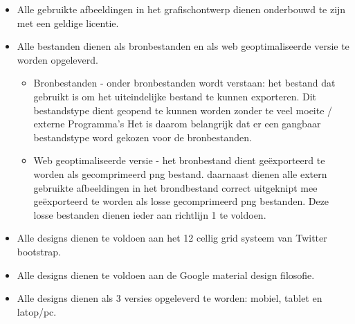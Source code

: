 \documentclass[]{report}
\begin{document}
\begin{itemize}
	\item Alle gebruikte afbeeldingen in het grafischontwerp dienen onderbouwd te zijn met een geldige licentie.
	\item Alle bestanden dienen als bronbestanden en als web geoptimaliseerde versie te worden opgeleverd.
	\begin{itemize}
		\item Bronbestanden - onder bronbestanden wordt verstaan: het bestand dat gebruikt is om het uiteindelijke bestand te kunnen exporteren. Dit bestandstype dient geopend te kunnen worden zonder te veel moeite / externe Programma's Het is daarom belangrijk dat er een gangbaar bestandstype word gekozen voor de bronbestanden.
		\item Web geoptimaliseerde versie - het bronbestand dient ge\"{e}xporteerd te worden als gecomprimeerd png bestand. daarnaast dienen alle extern gebruikte afbeeldingen in het brondbestand correct uitgeknipt mee ge\"{e}xporteerd te worden als losse gecomprimeerd png bestanden. Deze losse bestanden dienen ieder aan richtlijn 1 te voldoen.
		\newline
	\end{itemize} 
	\item Alle designs dienen te voldoen aan het 12 cellig grid systeem van Twitter bootstrap.
	\item Alle designs dienen te voldoen aan de Google material design filosofie.
	\item Alle designs dienen als 3 versies opgeleverd te worden: mobiel, tablet en latop/pc.
	\newline
\end{itemize} 
\end{document}
